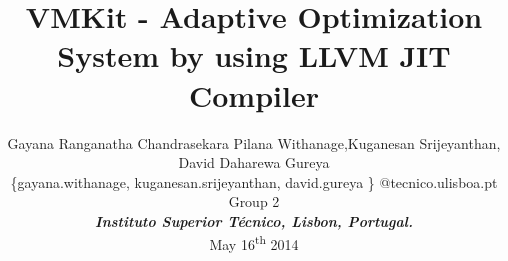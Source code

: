 \documentclass[times, 10pt,twocolumn]{article}
\begin{document}
\title{VMKit - Adaptive Optimization System by using LLVM JIT Compiler}

\author{
Gayana Ranganatha Chandrasekara Pilana Withanage,Kuganesan Srijeyanthan, David Daharewa Gureya\\
\{gayana.withanage, kuganesan.srijeyanthan, david.gureya \} @tecnico.ulisboa.pt\\
   Group 2\\
\textbf{\textit{Instituto Superior T\'{e}cnico, Lisbon, Portugal.}}\\
May 16\textsuperscript{th} 2014\\
}

\maketitle
\thispagestyle{empty}






% 







\end{document}
